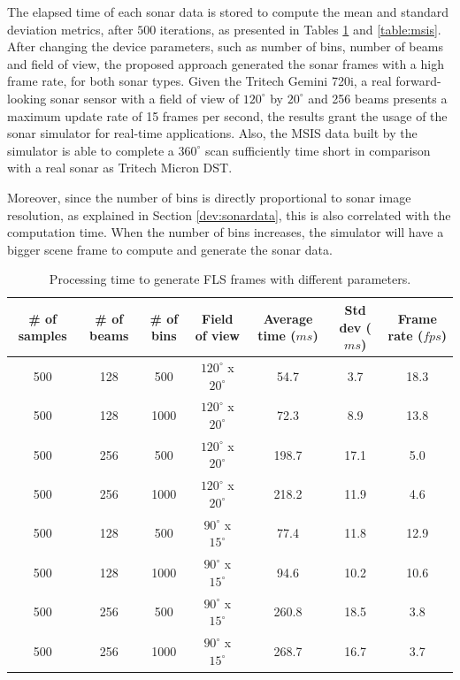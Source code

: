\documentclass[final,5p,times]{elsarticle}
\begin{document}
The elapsed time of each sonar data is stored to compute the mean and standard deviation metrics, after $500$ iterations, as presented in Tables \ref{table:fls} and \ref{table:msis}. After changing the device parameters, such as number of bins, number of beams and field of view, the proposed approach generated the sonar frames with a high frame rate, for both sonar types. Given the Tritech Gemini 720i, a real forward-looking sonar sensor with a field of view of $120^{\circ}$ by $20^{\circ}$ and 256 beams presents a maximum update rate of 15 frames per second, the results grant the usage of the sonar simulator for real-time applications. Also, the MSIS data built by the simulator is able to complete a $360^{\circ}$ scan sufficiently time short in comparison with a real sonar as Tritech Micron DST.

Moreover, since the number of bins is directly proportional to sonar image resolution, as explained in Section \ref{dev:sonardata}, this is also correlated with the computation time. When the number of bins increases, the simulator will have a bigger scene frame to compute and generate the sonar data.

\begin{table}[!h]
    \caption{Processing time to generate FLS frames with different parameters.}
    \label{table:fls}
    \begin{center}
        \begin{tabular}{| c | c | c | c | c | c | c |}
            \hline
            \# of samples & \# of beams & \# of bins & Field of view & Average time ($ms$) & Std dev ($ms$) & Frame rate ($fps$) \\
            \hline
            500     & 128     & 500       & $120^{\circ}$ x $20^{\circ}$        & 54.7    & 3.7   & 18.3 \\ \hline
            500     & 128     & 1000      & $120^{\circ}$ x $20^{\circ}$        & 72.3	& 8.9   & 13.8 \\ \hline
            500     & 256     & 500       & $120^{\circ}$ x $20^{\circ}$        & 198.7	& 17.1  & 5.0  \\ \hline
            500     & 256     & 1000      & $120^{\circ}$ x $20^{\circ}$        & 218.2	& 11.9  & 4.6  \\ \hline
            500     & 128     & 500       & $90^{\circ}$ x $15^{\circ}$         & 77.4	& 11.8  & 12.9 \\ \hline
            500     & 128     & 1000      & $90^{\circ}$ x $15^{\circ}$         & 94.6	& 10.2  & 10.6 \\ \hline
            500     & 256     & 500       & $90^{\circ}$ x $15^{\circ}$         & 260.8	& 18.5  & 3.8  \\ \hline
            500     & 256     & 1000      & $90^{\circ}$ x $15^{\circ}$         & 268.7	& 16.7  & 3.7  \\ \hline
        \end{tabular}
    \end{center}
\end{table}
\end{document}
